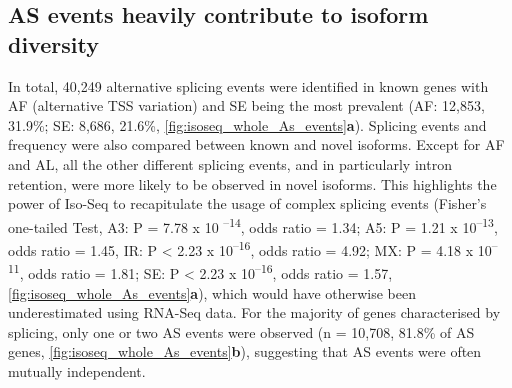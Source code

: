 \subsection{AS events heavily contribute to isoform diversity}
In total, 40,249 alternative splicing events were identified in known genes with AF (alternative TSS variation) and SE being the most prevalent (AF: 12,853, 31.9\%; SE: 8,686, 21.6\%, \cref{fig:isoseq_whole_As_events}\textbf{a}). Splicing events and frequency were also compared between known and novel isoforms. Except for AF and AL, all the other different splicing events, and in particularly intron retention, were more likely to be observed in novel isoforms. This highlights the power of Iso-Seq to recapitulate the usage of complex splicing events (Fisher's one-tailed Test, A3: P = 7.78 x 10 \textsuperscript{–14}, odds ratio = 1.34; A5: P = 1.21 x 10\textsuperscript{–13}, odds ratio = 1.45, IR: P < 2.23 x 10\textsuperscript{–16}, odds ratio = 4.92; MX: P = 4.18 x 10\textsuperscript{–11}, odds ratio = 1.81; SE: P < 2.23 x 10\textsuperscript{–16}, odds ratio = 1.57, \cref{fig:isoseq_whole_As_events}\textbf{a}), which would have otherwise been underestimated using RNA-Seq data. For the majority of genes characterised by splicing, only one or two AS events were observed (n = 10,708, 81.8\% of AS genes, \cref{fig:isoseq_whole_As_events}\textbf{b}), suggesting that AS events were often mutually independent. 

